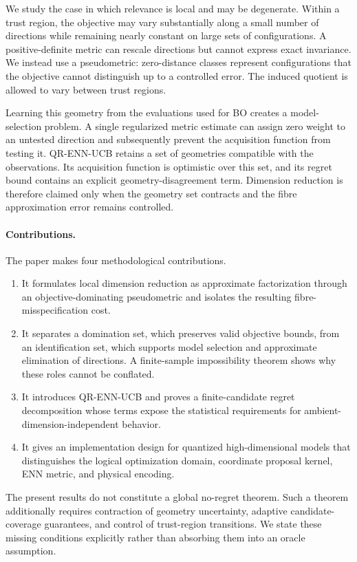 \documentclass[11pt]{article}
\theoremstyle{definition}
\theoremstyle{remark}
\newcommand{\1}{\mathbf 1}
\begin{document}
We study the case in which relevance is local and may be degenerate.  Within a trust region, the
objective may vary substantially along a small number of directions while remaining nearly constant
on large sets of configurations.  A positive-definite metric can rescale directions but cannot
express exact invariance.  We instead use a pseudometric: zero-distance classes represent
configurations that the objective cannot distinguish up to a controlled error.  The induced quotient
is allowed to vary between trust regions.

Learning this geometry from the evaluations used for BO creates a model-selection problem.  A
single regularized metric estimate can assign zero weight to an untested direction and subsequently
prevent the acquisition function from testing it.  QR-ENN-UCB retains a set of geometries compatible
with the observations.  Its acquisition function is optimistic over this set, and its regret bound
contains an explicit geometry-disagreement term.  Dimension reduction is therefore claimed only
when the geometry set contracts and the fibre approximation error remains controlled.

\paragraph{Contributions.}
The paper makes four methodological contributions.
\begin{enumerate}
\item It formulates local dimension reduction as approximate factorization through an
objective-dominating pseudometric and isolates the resulting fibre-misspecification cost.
\item It separates a domination set, which preserves valid objective bounds, from an identification
set, which supports model selection and approximate elimination of directions.  A finite-sample
impossibility theorem shows why these roles cannot be conflated.
\item It introduces QR-ENN-UCB and proves a finite-candidate regret decomposition whose terms expose
the statistical requirements for ambient-dimension-independent behavior.
\item It gives an implementation design for quantized high-dimensional models that distinguishes
the logical optimization domain, coordinate proposal kernel, ENN metric, and physical encoding.
\end{enumerate}

The present results do not constitute a global no-regret theorem.  Such a theorem additionally
requires contraction of geometry uncertainty, adaptive candidate-coverage guarantees, and control
of trust-region transitions.  We state these missing conditions explicitly rather than absorbing
them into an oracle assumption.
\end{document}
